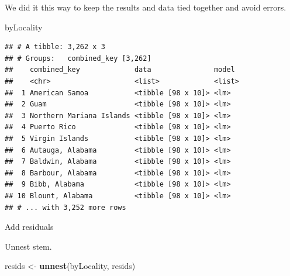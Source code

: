 \documentclass[
]{article}
\newenvironment{Shaded}{\begin{snugshade}}{\end{snugshade}}
\newcommand{\DataTypeTok}[1]{\textcolor[rgb]{0.13,0.29,0.53}{#1}}
\newcommand{\KeywordTok}[1]{\textcolor[rgb]{0.13,0.29,0.53}{\textbf{#1}}}
\newcommand{\NormalTok}[1]{#1}
\newcommand{\OperatorTok}[1]{\textcolor[rgb]{0.81,0.36,0.00}{\textbf{#1}}}
\newcommand{\StringTok}[1]{\textcolor[rgb]{0.31,0.60,0.02}{#1}}
\begin{document}
\begin{Shaded}
\end{Shaded}

We did it this way to keep the results and data tied together and avoid
errors.

\begin{Shaded}
\begin{Highlighting}[]
\NormalTok{byLocality}
\end{Highlighting}
\end{Shaded}

\begin{verbatim}
## # A tibble: 3,262 x 3
## # Groups:   combined_key [3,262]
##    combined_key             data               model 
##    <chr>                    <list>             <list>
##  1 American Samoa           <tibble [98 x 10]> <lm>  
##  2 Guam                     <tibble [98 x 10]> <lm>  
##  3 Northern Mariana Islands <tibble [98 x 10]> <lm>  
##  4 Puerto Rico              <tibble [98 x 10]> <lm>  
##  5 Virgin Islands           <tibble [98 x 10]> <lm>  
##  6 Autauga, Alabama         <tibble [98 x 10]> <lm>  
##  7 Baldwin, Alabama         <tibble [98 x 10]> <lm>  
##  8 Barbour, Alabama         <tibble [98 x 10]> <lm>  
##  9 Bibb, Alabama            <tibble [98 x 10]> <lm>  
## 10 Blount, Alabama          <tibble [98 x 10]> <lm>  
## # ... with 3,252 more rows
\end{verbatim}

Add residuals

\begin{Shaded}
\end{Shaded}

Unnest stem.

\begin{Shaded}
\begin{Highlighting}[]
\NormalTok{resids <-}\StringTok{ }\KeywordTok{unnest}\NormalTok{(byLocality, resids)}
\end{Highlighting}
\end{Shaded}
\end{document}
